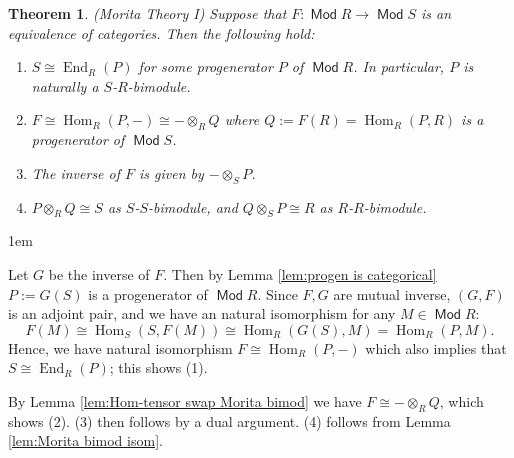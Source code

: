 \documentclass[11pt,a4paper]{article}
\makeatletter
\numberwithin{equation}{section}
\renewenvironment{proof}[1][\proofname]{\par
    \pushQED{\qed}%
    \normalfont \topsep0\p@\@plus6\p@ \labelsep1em\relax
    \trivlist
    \item[\hskip\labelsep\indent
        \bfseries #1]\ignorespaces
    \mbox{}
}{
    \popQED\endtrivlist\@endpefalse
}
\theoremstyle{all}
\newtheorem{theorem}{Theorem}[section]
\theoremstyle{remark}
\newcommand{\Hom}{\operatorname{Hom}\nolimits}
\newcommand{\End}{\operatorname{End}\nolimits}
\DeclareMathOperator{\Mod}{\mathsf{Mod}}
\makeatother
\begin{document}
\begin{theorem}(Morita Theory I)
Suppose that $F:\Mod R\to \Mod S$ is an equivalence of categories.
Then the following hold:
\begin{enumerate}
\item $S\cong \End_R(P)$ for some progenerator $P$ of $\Mod R$.  In particular, $P$ is naturally a $S$-$R$-bimodule.

\item $F \cong \Hom_R(P,-)\cong -\otimes_RQ$ where $Q:=F(R)=\Hom_R(P,R)$ is a progenerator of $\Mod S$.

\item The inverse of $F$ is given by $-\otimes_S P$.

\item $P\otimes_R Q\cong S$ as $S$-$S$-bimodule, and $Q\otimes_S P\cong R$ as $R$-$R$-bimodule.
\end{enumerate}
\end{theorem}
\begin{proof}
Let $G$ be the inverse of $F$.  Then by Lemma \ref{lem:progen is categorical} $P:=G(S)$ is a progenerator of $\Mod R$.  Since $F,G$ are mutual inverse, $(G,F)$ is an adjoint pair, and we have an natural isomorphism for any $M\in \Mod R$:
\[
F(M) \cong \Hom_{S}(S, F(M)) \cong \Hom_R(G(S), M) = \Hom_R(P,M).
\]
Hence, we have natural isomorphism $F\cong \Hom_R(P,-)$ which also implies that $S\cong \End_R(P)$; this shows (1).

By Lemma \ref{lem:Hom-tensor swap Morita bimod} we have $F\cong -\otimes_R Q$, which shows (2).  (3) then follows by a dual argument.  (4) follows from Lemma \ref{lem:Morita bimod isom}.
\end{proof}
\end{document}
